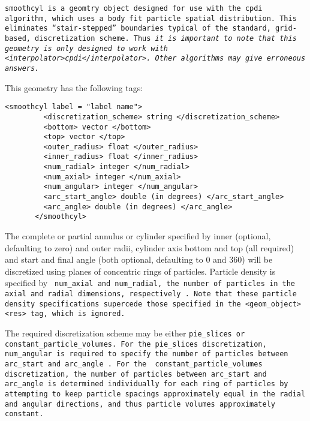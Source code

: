\tt smoothcyl \normalfont is a geomtry object designed for use with
the cpdi algorithm, which uses a body fit particle spatial
distribution.  This eliminates ``stair-stepped'' boundaries typical of
the standard, grid-based, discretization scheme.  Thus {\it it is
  important to note that this geometry is only designed to work with
  \tt <interpolator>cpdi</interpolator>\normalfont. \it Other
  algorithms may give erroneous answers.}

This geometry has the following tags:

\begin{Verbatim}[fontsize=\footnotesize]
	   <smoothcyl label = "label name">
	     <discretization_scheme> string </discretization_scheme>
	     <bottom> vector </bottom>
	     <top> vector </top>
	     <outer_radius> float </outer_radius>
	     <inner_radius> float </inner_radius>
	     <num_radial> integer </num_radial>
	     <num_axial> integer </num_axial>
	     <num_angular> integer </num_angular>
	     <arc_start_angle> double (in degrees) </arc_start_angle>
	     <arc_angle> double (in degrees) </arc_angle>
	   </smoothcyl>
\end{Verbatim}

The complete or partial annulus or cylinder specified by inner
(optional, defaulting to zero) and outer radii, cylinder axis bottom
and top (all required) and start and final angle (both optional,
defaulting to 0 and 360) will be discretized using planes of
concentric rings of particles.  Particle density is specified by \tt
num\_axial \normalfont and \tt num\_radial\normalfont, the number of
particles in the axial and radial dimensions, respectively
\normalfont.  Note that these particle density specifications
supercede those specified in the \tt <geom\_object> <res> \normalfont
tag, which is ignored.

The required discretization scheme may be either \tt pie\_slices
\normalfont or \tt constant\_particle\_volumes\normalfont.  For the
\tt pie\_slices \normalfont discretization, \tt num\_angular
\normalfont is required to specify the number of particles between \tt
arc\_start \normalfont and \tt arc\_angle \normalfont.  For the \tt
constant\_particle\_volumes \normalfont discretization, the number of
particles between \tt arc\_start \normalfont and \tt arc\_angle
\normalfont is determined individually for each ring of particles by
attempting to keep particle spacings approximately equal in the radial
and angular directions, and thus particle volumes approximately
constant.

